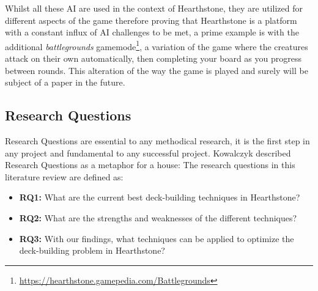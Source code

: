 \documentclass{report}
\begin{document}
	Whilst all these AI are used in the context of Hearthstone, they are utilized for different aspects of the game therefore proving that Hearthstone is a platform with a constant influx of AI challenges to be met, a prime example is with the additional {\it{battlegrounds}} gamemode\footnote{\url{https://hearthstone.gamepedia.com/Battlegrounds}}, a variation of the game where the creatures attack on their own automatically, then completing your board as you progress between rounds. This alteration of the way the game is played and surely will be subject of a paper in the future. 

\subsection{Research Questions}
Research Questions are essential to any methodical research, it is the first step in any project and fundamental to any successful project. Kowalczyk\cite{Kowalczyk2013} described Research Questions as a metaphor for a house: 
The research questions in this literature review are defined as:

\begin{itemize}
\item \textbf{RQ1:} What are the current best deck-building techniques in Hearthstone?
\item \textbf{RQ2:} What are the strengths and weaknesses of the different techniques?
\item \textbf{RQ3:} With our findings, what techniques can be applied to optimize the deck-building problem in Hearthstone?
\end{itemize}
\end{document}
